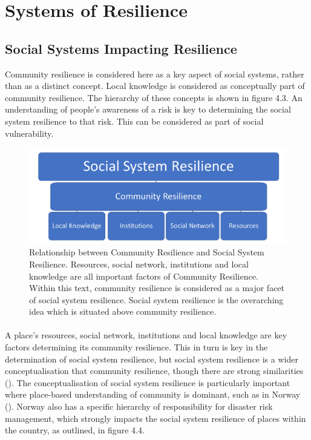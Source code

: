 \section{Systems of Resilience }

\subsection{Social Systems Impacting Resilience}
Community resilience is considered here as a key aspect of social systems, rather than as a distinct concept. Local knowledge is considered as conceptually part of community resilience. The hierarchy of these concepts is shown in figure 4.3. An understanding of people's awareness of a risk is key to determining the social system resilience to that risk. This can be considered as part of social vulnerability.

\begin{figure}[h]
    \centering
    \includegraphics[width=1\textwidth]{fig_theory/new_social_system.png}
    \caption{Relationship between Community Resilience and Social System Resilience. Resources, social network, institutions and local knowledge are all important factors of Community Resilience. Within this text, community resilience is considered as a major facet of social system resilience. Social system resilience is the overarching idea which is situated above community resilience.}
    \label{fig:social_resilience}
\end{figure}
\paragraph{}

A place's resources, social network, institutions and local knowledge are key factors determining its community resilience. This in turn is key in the determination of social system resilience, but social system resilience is a wider conceptualisation that community resilience, though there are strong similarities (\cite{cutter_community_2020}). The conceptualisation of social system resilience is particularly important where place-based understanding of community is dominant, such as in Norway (\cite{rasanen_conceptualizing_2020}). Norway also has a specific hierarchy of responsibility for disaster risk management, which strongly impacts the social system resilience of places within the country, as outlined, in figure 4.4.


